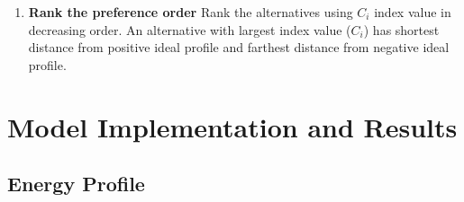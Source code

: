 \documentclass{mcmthesis}
\begin{document}
\begin{enumerate}
          
          \item \textbf{Rank the preference order}
        Rank the alternatives using $C_i$ index value in decreasing order. An alternative with largest index value ($C_i$) has shortest distance from positive ideal profile and farthest distance from negative ideal profile.

        \end{enumerate}

\section{Model Implementation and Results}
        \subsection{Energy Profile}
\end{document}
